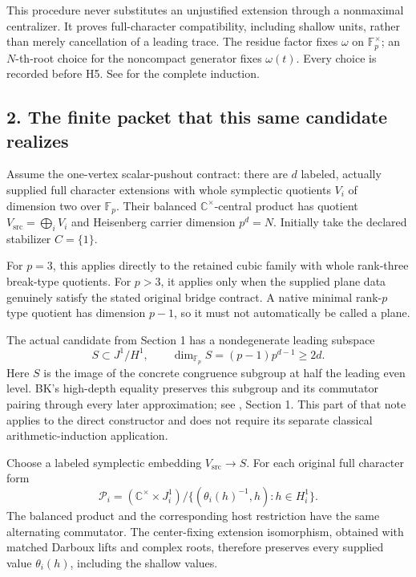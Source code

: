This procedure never substitutes an unjustified extension through a
nonmaximal centralizer. It proves full-character compatibility,
including shallow units, rather than merely cancellation of a leading
trace. The residue factor fixes \(\omega\) on \(\mathbb F_p^\times\); an
\(N\)-th-root choice for the noncompact generator fixes \(\omega(t)\).
Every choice is recorded before H5. See
 for the
complete induction.

\hypertarget{odd_synthesis-the-finite-packet-that-this-same-candidate-realizes}{%
\subsection{2. The finite packet that this same candidate
realizes}\label{odd_synthesis-the-finite-packet-that-this-same-candidate-realizes}}

Assume the one-vertex scalar-pushout contract: there are \(d\) labeled,
actually supplied full character extensions with whole symplectic
quotients \(V_i\) of dimension two over \(\mathbb F_p\). Their balanced
\(\mathbb C^\times\)-central product has quotient
\(V_{\mathrm{src}}=\bigoplus_iV_i\) and Heisenberg carrier dimension
\(p^d=N\). Initially take the declared stabilizer \(C=\{1\}\).

For \(p=3\), this applies directly to the retained cubic family with
whole rank-three break-type quotients. For \(p>3\), it applies only when
the supplied plane data genuinely satisfy the stated original bridge
contract. A native minimal rank-\(p\) type quotient has dimension
\(p-1\), so it must not automatically be called a plane.

The actual candidate from Section 1 has a nondegenerate leading subspace
\[
S\subset J^1/H^1,\qquad
\dim_{\mathbb F_p}S=(p-1)p^{d-1}\ge2d.
\] Here \(S\) is the image of the concrete congruence subgroup at half
the leading even level. BK's high-depth equality preserves this subgroup
and its commutator pairing through every later approximation; see
, Section 1. This part
of that note applies to the direct constructor and does not require its
separate classical arithmetic-induction application.

Choose a labeled symplectic embedding \(V_{\mathrm{src}}\to S\). For
each original full character form \[
\mathcal P_i=(\mathbb C^\times\times J_i^1)/
 \{(\theta_i(h)^{-1},h):h\in H_i^1\}.
\] The balanced product and the corresponding host restriction have the
same alternating commutator. The center-fixing extension isomorphism,
obtained with matched Darboux lifts and complex roots, therefore
preserves every supplied value \(\theta_i(h)\), including the shallow
values.

